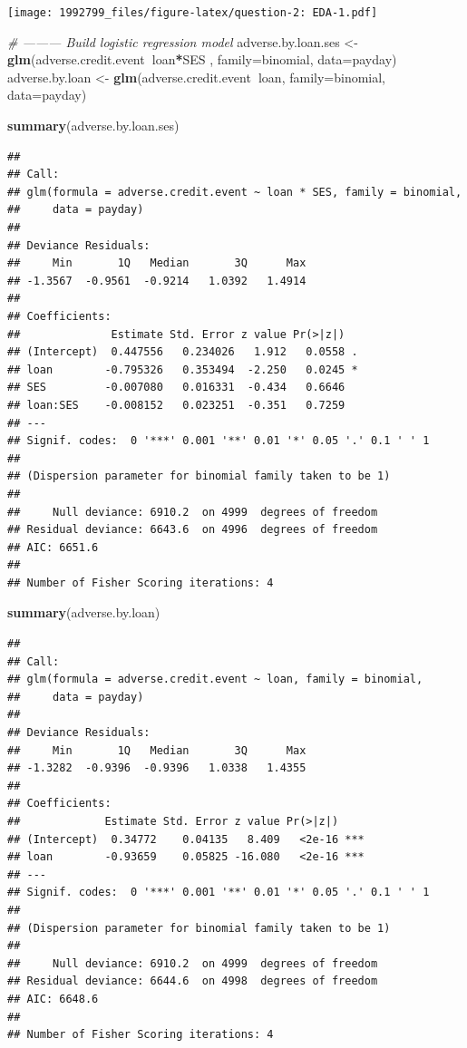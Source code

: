 \documentclass[]{article}
\newenvironment{Shaded}{\begin{snugshade}}{\end{snugshade}}
\newcommand{\CommentTok}[1]{\textcolor[rgb]{0.56,0.35,0.01}{\textit{#1}}}
\newcommand{\DataTypeTok}[1]{\textcolor[rgb]{0.13,0.29,0.53}{#1}}
\newcommand{\KeywordTok}[1]{\textcolor[rgb]{0.13,0.29,0.53}{\textbf{#1}}}
\newcommand{\NormalTok}[1]{#1}
\newcommand{\OperatorTok}[1]{\textcolor[rgb]{0.81,0.36,0.00}{\textbf{#1}}}
\newcommand{\StringTok}[1]{\textcolor[rgb]{0.31,0.60,0.02}{#1}}
\begin{document}
\texttt{[image: 1992799\_files/figure-latex/question-2: EDA-1.pdf]}

\begin{Shaded}
\begin{Highlighting}[]
\CommentTok{# --------- Build logistic regression model }
\NormalTok{adverse.by.loan.ses <-}\StringTok{ }\KeywordTok{glm}\NormalTok{(adverse.credit.event}\OperatorTok{~}\NormalTok{loan}\OperatorTok{*}\NormalTok{SES , }\DataTypeTok{family=}\NormalTok{binomial, }\DataTypeTok{data=}\NormalTok{payday)}
\NormalTok{adverse.by.loan <-}\StringTok{ }\KeywordTok{glm}\NormalTok{(adverse.credit.event}\OperatorTok{~}\NormalTok{loan, }\DataTypeTok{family=}\NormalTok{binomial, }\DataTypeTok{data=}\NormalTok{payday)}

\KeywordTok{summary}\NormalTok{(adverse.by.loan.ses)}
\end{Highlighting}
\end{Shaded}

\begin{verbatim}
## 
## Call:
## glm(formula = adverse.credit.event ~ loan * SES, family = binomial, 
##     data = payday)
## 
## Deviance Residuals: 
##     Min       1Q   Median       3Q      Max  
## -1.3567  -0.9561  -0.9214   1.0392   1.4914  
## 
## Coefficients:
##              Estimate Std. Error z value Pr(>|z|)  
## (Intercept)  0.447556   0.234026   1.912   0.0558 .
## loan        -0.795326   0.353494  -2.250   0.0245 *
## SES         -0.007080   0.016331  -0.434   0.6646  
## loan:SES    -0.008152   0.023251  -0.351   0.7259  
## ---
## Signif. codes:  0 '***' 0.001 '**' 0.01 '*' 0.05 '.' 0.1 ' ' 1
## 
## (Dispersion parameter for binomial family taken to be 1)
## 
##     Null deviance: 6910.2  on 4999  degrees of freedom
## Residual deviance: 6643.6  on 4996  degrees of freedom
## AIC: 6651.6
## 
## Number of Fisher Scoring iterations: 4
\end{verbatim}

\begin{Shaded}
\begin{Highlighting}[]
\KeywordTok{summary}\NormalTok{(adverse.by.loan)}
\end{Highlighting}
\end{Shaded}

\begin{verbatim}
## 
## Call:
## glm(formula = adverse.credit.event ~ loan, family = binomial, 
##     data = payday)
## 
## Deviance Residuals: 
##     Min       1Q   Median       3Q      Max  
## -1.3282  -0.9396  -0.9396   1.0338   1.4355  
## 
## Coefficients:
##             Estimate Std. Error z value Pr(>|z|)    
## (Intercept)  0.34772    0.04135   8.409   <2e-16 ***
## loan        -0.93659    0.05825 -16.080   <2e-16 ***
## ---
## Signif. codes:  0 '***' 0.001 '**' 0.01 '*' 0.05 '.' 0.1 ' ' 1
## 
## (Dispersion parameter for binomial family taken to be 1)
## 
##     Null deviance: 6910.2  on 4999  degrees of freedom
## Residual deviance: 6644.6  on 4998  degrees of freedom
## AIC: 6648.6
## 
## Number of Fisher Scoring iterations: 4
\end{verbatim}
\end{document}
